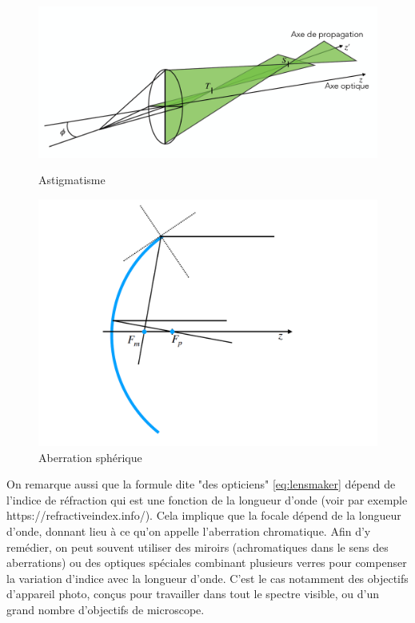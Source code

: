 \documentclass[a4paper]{book}
\begin{document}
\begin{figure}
    \centering
    \begin{minipage}{0.6\textwidth}
        \centering
        \includegraphics[width=1.\textwidth]{pictures/Astig.png} %
        \caption{Astigmatisme}
    \end{minipage}\hfill
    \begin{minipage}{0.4\textwidth}
        \centering
        \includegraphics[width=1.0\textwidth]{pictures/abSpher.png} %
        \caption{Aberration sphérique}
    \end{minipage}
\end{figure}


On remarque aussi que la formule dite "des opticiens" \ref{eq:lensmaker} dépend de l'indice de réfraction qui est une fonction de la longueur d'onde (voir par exemple https://refractiveindex.info/). Cela implique que la focale dépend de la longueur d'onde, donnant lieu à ce qu'on appelle l'aberration chromatique. Afin d'y remédier, on peut souvent utiliser des miroirs (achromatiques dans le sens des aberrations) ou des optiques spéciales combinant plusieurs verres pour compenser la variation d'indice avec la longueur d'onde. C'est le cas notamment des objectifs d'appareil photo, conçus pour travailler dans tout le spectre visible, ou d'un grand nombre d'objectifs de microscope. 
\end{document}
